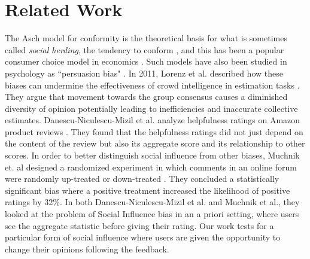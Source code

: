 \section{Related Work}



The Asch model for conformity is the theoretical basis for what is sometimes called \emph{social herding}, the tendency to conform \cite{banerjee1992simple,bikhchandani2000herd}, and this has been a popular consumer choice model in economics \cite{burnkrant1975informational,dholakia2002auction,huang2006herding}. 
Such models have also been studied in psychology as ``persuasion bias" \cite{demarzo2003persuasion}.
In 2011, Lorenz et al. described how these biases can undermine the effectiveness of crowd intelligence in estimation tasks \cite{lorenz2011social}. 
They argue that movement towards the group consensus causes a diminished diversity of opinion potentially leading to inefficiencies and inaccurate collective estimates.
Danescu-Niculescu-Mizil et al. analyze helpfulness ratings on Amazon product reviews \cite{danescu2009opinions}.
They found that the helpfulness ratings did not just depend on the content of the review but also its aggregate score and its relationship to other scores.
In order to better distinguish social influence from other biases, Muchnik et. al designed a randomized experiment in which comments in an online forum were randomly up-treated or down-treated \cite{muchnik2013social}.
They concluded a statistically significant bias where a positive treatment increased the likelihood of positive ratings by 32\%. 
In both Danescu-Niculescu-Mizil et al. and Muchnik et al., they looked at the problem of Social Influence bias in an a priori setting, where users see the aggregate statistic before giving their rating.
Our work tests for a particular form of social influence where users are given the opportunity to change their opinions following the feedback. 

